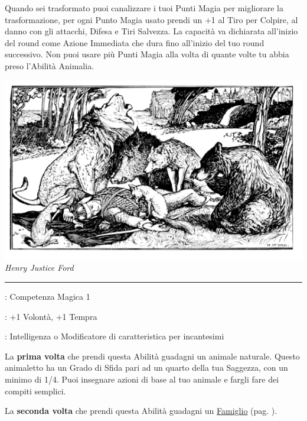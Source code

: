 \begin{multicols}{2}
Quando sei trasformato puoi canalizzare i tuoi Punti Magia per migliorare la trasformazione, per ogni Punto Magia usato prendi un +1 al Tiro per Colpire, al danno con gli attacchi, Difesa e Tiri Salvezza. La capacità va dichiarata all'inizio del round come Azione Immediata che dura fino all'inizio del tuo round successivo. Non puoi usare più Punti Magia alla volta di quante volte tu abbia preso l'Abilità Animalia.

\begin{center}
\includegraphics[width=0.9\linewidth]{immagini/animalia3.png}
\emph{Henry Justice Ford}
\end{center}

\smallskip\noindent\rule{\linewidth}{2pt} \hypertarget{Animaletto / Famiglio}{}\medskip{}
\noindent
\begin{description}[noitemsep, topsep=0pt, parsep=0pt, partopsep=0pt, leftmargin=0cm, labelwidth=2.5cm]
    \item[\textbf{Requisito}]: Competenza Magica 1
    \item[\textbf{Tiri Salvezza}]: +1 Volontà, +1 Tempra
    \item[\textbf{Caratteristica}]: Intelligenza o Modificatore di caratteristica per incantesimi
\end{description}

La \textbf{prima volta} che prendi questa Abilità guadagni un animale naturale. Questo animaletto ha un Grado di Sfida pari ad un quarto della tua Saggezza, con un minimo di 1/4. Puoi insegnare azioni di base al tuo animale e fargli fare dei compiti semplici.

La \textbf{seconda volta} che prendi questa Abilità guadagni un \hyperlink{famiglio}{Famiglio} (pag. \pageref{famiglio}).


\end{multicols}

